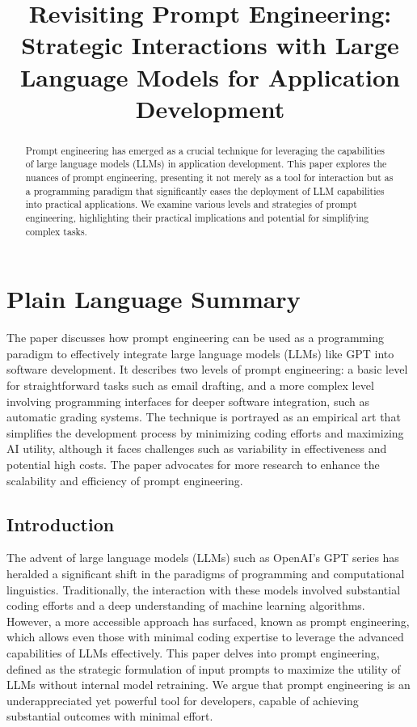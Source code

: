 \documentclass[
]{agujournal2019}
\begin{document}
\title{Revisiting Prompt Engineering: Strategic Interactions with Large
Language Models for Application Development}



\begin{abstract}
Prompt engineering has emerged as a crucial technique for leveraging the
capabilities of large language models (LLMs) in application development.
This paper explores the nuances of prompt engineering, presenting it not
merely as a tool for interaction but as a programming paradigm that
significantly eases the deployment of LLM capabilities into practical
applications. We examine various levels and strategies of prompt
engineering, highlighting their practical implications and potential for
simplifying complex tasks.
\end{abstract}

\section*{Plain Language Summary}
The paper discusses how prompt engineering can be used as a programming
paradigm to effectively integrate large language models (LLMs) like GPT
into software development. It describes two levels of prompt
engineering: a basic level for straightforward tasks such as email
drafting, and a more complex level involving programming interfaces for
deeper software integration, such as automatic grading systems. The
technique is portrayed as an empirical art that simplifies the
development process by minimizing coding efforts and maximizing AI
utility, although it faces challenges such as variability in
effectiveness and potential high costs. The paper advocates for more
research to enhance the scalability and efficiency of prompt
engineering.



\subsection{Introduction}\label{introduction}

The advent of large language models (LLMs) such as OpenAI's GPT series
has heralded a significant shift in the paradigms of programming and
computational linguistics. Traditionally, the interaction with these
models involved substantial coding efforts and a deep understanding of
machine learning algorithms. However, a more accessible approach has
surfaced, known as prompt engineering, which allows even those with
minimal coding expertise to leverage the advanced capabilities of LLMs
effectively. This paper delves into prompt engineering, defined as the
strategic formulation of input prompts to maximize the utility of LLMs
without internal model retraining. We argue that prompt engineering is
an underappreciated yet powerful tool for developers, capable of
achieving substantial outcomes with minimal effort.
\end{document}
